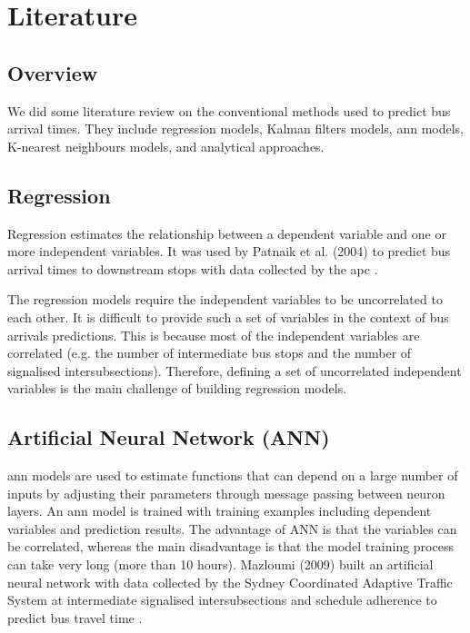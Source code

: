 \section{Literature}
\label{sec:literature}
\subsection{Overview}
\par We did some literature review on the conventional methods used to predict bus arrival times. They include regression models, Kalman filters models, \acrfull{ann} models, K-nearest neighbours models, and analytical approaches.

\subsection{Regression}
\par Regression estimates the relationship between a dependent variable and one or more independent variables. It was used by Patnaik et al. (2004) to predict bus arrival times to downstream stops with data collected by the \acrfull{apc} \cite{regression_models}.

\par The regression models require the independent variables to be uncorrelated to each other. It is difficult to provide such a set of variables in the context of bus arrivals predictions. This is because most of the independent variables are correlated (e.g. the number of intermediate bus stops and the number of signalised intersubsections). Therefore, defining a set of uncorrelated independent variables is the main challenge of building regression models.

\subsection{Artificial Neural Network (ANN)}
\par \acrshort{ann} models are used to estimate functions that can depend on a large number of inputs by adjusting their parameters through message passing between neuron layers. An \acrshort{ann} model is trained with training examples including dependent variables and prediction results. The advantage of ANN is that the variables can be correlated, whereas the main disadvantage is that the model training process can take very long (more than 10 hours). Mazloumi (2009) built an artificial neural network with data collected by the Sydney Coordinated Adaptive Traffic System at intermediate signalised intersubsections and schedule adherence to predict bus travel time \cite{ann}.

